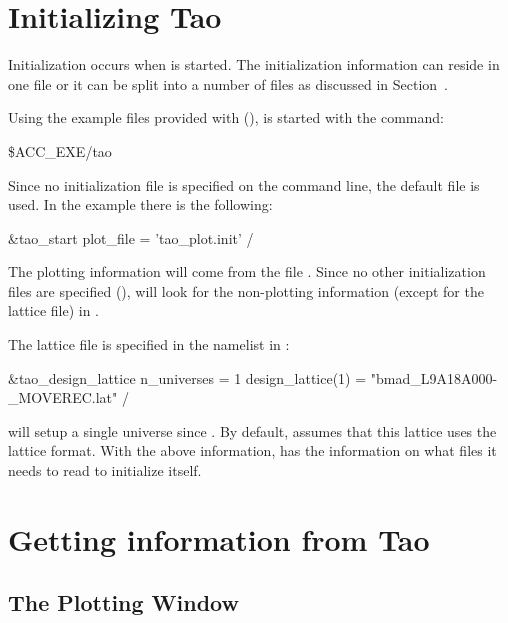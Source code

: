 \section{Initializing Tao}
\label{s:initializing}

Initialization occurs when \tao is started. The initialization
information can reside in one file or it can be split into a number of
files as discussed in Section~.

Using the example files provided with \tao (), \tao
is started with the command:
\begin{example}
  \$ACC_EXE/tao
\end{example}
Since no initialization file is specified on the command line, the
default file  is used. In the example  there
is the following:
\begin{example}
  &tao_start
    plot_file = 'tao_plot.init'
  /
\end{example}
The plotting information will
come from the file . Since no other initialization
files are specified (), \tao will look for the
non-plotting information (except for the lattice file) in .

The lattice file is specified in the  namelist
in :
\begin{example}
  &tao_design_lattice
    n_universes = 1
    design_lattice(1) = "bmad_L9A18A000-_MOVEREC.lat"
  /
\end{example}
\tao will setup a single universe since .
By default, \tao assumes that this lattice uses the \bmad lattice
format.  With the above information, \tao has the information on what
files it needs to read to initialize itself.

\section{Getting information from Tao}
\label{s:get.info}

\subsection{The Plotting Window}

